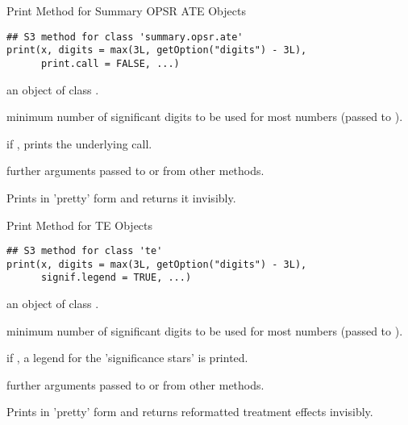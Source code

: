 %
\begin{Description}
Print Method for Summary OPSR ATE Objects
\end{Description}
%
\begin{Usage}
\begin{verbatim}
## S3 method for class 'summary.opsr.ate'
print(x, digits = max(3L, getOption("digits") - 3L),
      print.call = FALSE, ...)
\end{verbatim}
\end{Usage}
%
\begin{Arguments}
\begin{ldescription}
\item[\code{x}] an object of class .

\item[\code{digits}] minimum number of significant digits to be used for most numbers (passed to ).

\item[\code{print.call}] if , prints the underlying call.

\item[\code{...}] further arguments passed to or from other methods.
\end{ldescription}
\end{Arguments}
%
\begin{Value}
Prints  in 'pretty' form and returns it invisibly.
\end{Value}


%
\begin{Description}
Print Method for TE Objects
\end{Description}
%
\begin{Usage}
\begin{verbatim}
## S3 method for class 'te'
print(x, digits = max(3L, getOption("digits") - 3L),
      signif.legend = TRUE, ...)
\end{verbatim}
\end{Usage}
%
\begin{Arguments}
\begin{ldescription}
\item[\code{x}] an object of class .

\item[\code{digits}] minimum number of significant digits to be used for most numbers
(passed to ).

\item[\code{signif.legend}] if , a legend for the 'significance stars' is printed.

\item[\code{...}] further arguments passed to or from other methods.
\end{ldescription}
\end{Arguments}
%
\begin{Value}
Prints  in 'pretty' form and returns reformatted treatment effects
invisibly.
\end{Value}

